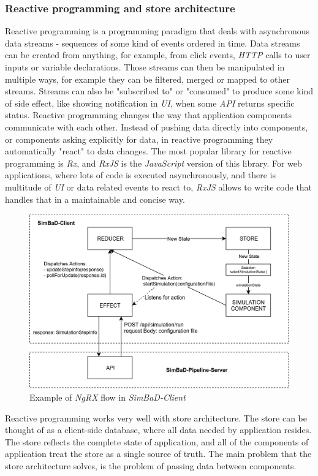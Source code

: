 \subsubsection{Reactive programming and store architecture}
Reactive programming is a programming paradigm that deals with asynchronous data streams - sequences of some kind of events ordered in time. Data streams can be created from anything, for example, from click events, \textit{HTTP} calls to user inputs or variable declarations. Those streams can then be manipulated in multiple ways, for example they can be filtered, merged or mapped to other streams. Streams can also be "subscribed to" or "consumed" to produce some kind of side effect, like showing notification in \textit{UI}, when some \textit{API} returns specific status. Reactive programming changes the way that application components communicate with each other. Instead of pushing data directly into components, or components asking explicitly for data, in reactive programming they automatically "react" to data changes. The most popular library for reactive programming is \textit{Rx}, and \textit{RxJS} is the \textit{JavaScript} version of this library. For web applications, where lots of code is executed asynchronously, and there is multitude of \textit{UI} or data related events to react to, \textit{RxJS} allows to write code that handles that in a maintainable and concise way.
\begin{figure}[h!]
	\centering
		\includegraphics[width=0.9\linewidth]{diagrams/ngrx.png}
	\caption{Example of \textit{NgRX} flow in \textit{SimBaD-Client}}
	\label{fig:ngrx}
\end{figure}
Reactive programming works very well with store architecture. The store can be thought of as a client-side database, where all data needed by application resides. The store reflects the complete state of application, and all of the components of application treat the store as a single source of truth. The main problem that the store architecture solves, is the problem of passing data between  components.
